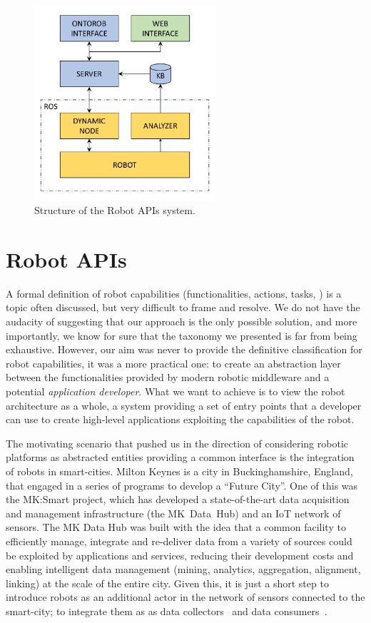 \begin{figure}[t]
    \centering
    \includegraphics[width=0.6\textwidth]{gfx/onto/robot_api5}
    \caption{Structure of the Robot APIs system.}\label{fig:robot-api}
\end{figure}

\section{Robot APIs} 
A formal definition of robot capabilities (functionalities, actions, tasks, \etc) is a topic often discussed, but very difficult to frame and resolve. We do not have the audacity of suggesting that our approach is the only possible solution, and more importantly, we know for sure that the taxonomy we presented is far from being exhaustive. However, our aim was never to provide the definitive classification for robot capabilities, it was a more practical one: to create an abstraction layer between the functionalities provided by modern robotic middleware and a potential \textit{application developer}. What we want to achieve is to view the robot architecture as a whole, a system providing a set of entry points that a developer can use to create high-level applications exploiting the capabilities of the robot.

The motivating scenario that pushed us in the direction of considering robotic platforms as abstracted entities providing a common interface is the integration of robots in smart-cities. Milton Keynes is a city in Buckinghamshire, England, that engaged in a series of programs to develop a ``Future City''. One of this was the MK:Smart project, which has developed a state-of-the-art data acquisition and management infrastructure (the MK~Data~Hub) and an IoT network of sensors. The MK Data Hub was built with the idea that a common facility to efficiently manage, integrate and re-deliver data from a variety of sources could be exploited by applications and services, reducing their development costs and enabling intelligent data management (mining, analytics, aggregation, alignment, linking) at the scale of the entire city. Given this, it is just a short step to introduce robots as an additional actor in the network of sensors connected to the smart-city; to integrate them as as data collectors~\cite{tiddi2016update} and data consumers~\cite{daga2016addressing}.

